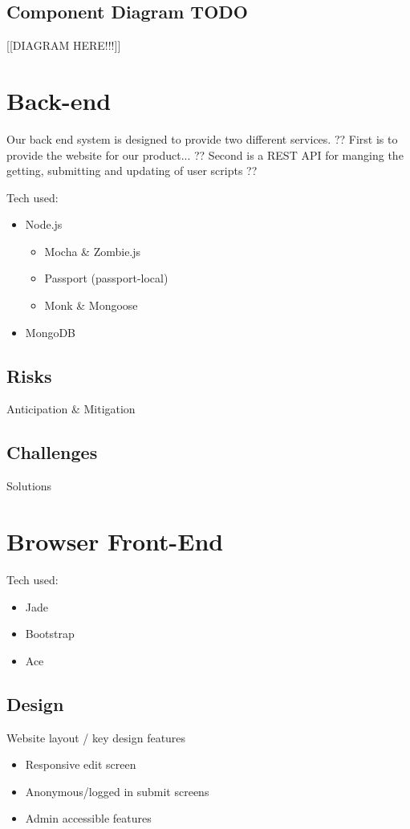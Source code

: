 \subsection{Component Diagram TODO}

[[DIAGRAM HERE!!!]]

\section{Back-end}

Our back end system is designed to provide two different services. ??
First is to provide the website for our product... ??
Second is a REST API for manging the getting, submitting and updating of user scripts ?? 

Tech used:
\begin{itemize}
\item Node.js
	\begin{itemize}
		\item Mocha \& Zombie.js
		\item Passport (passport-local)
		\item Monk \& Mongoose
	\end{itemize}
\item MongoDB
\end{itemize}

\subsection{Risks}
Anticipation \& Mitigation

\subsection{Challenges}
Solutions

\section{Browser Front-End}
Tech used:
\begin{itemize}
\item Jade 
\item Bootstrap
\item Ace
\end{itemize}

\subsection{Design}
Website layout / key design features 
\begin{itemize}
\item Responsive edit screen
\item Anonymous/logged in submit screens
\item Admin accessible features
\end{itemize}

